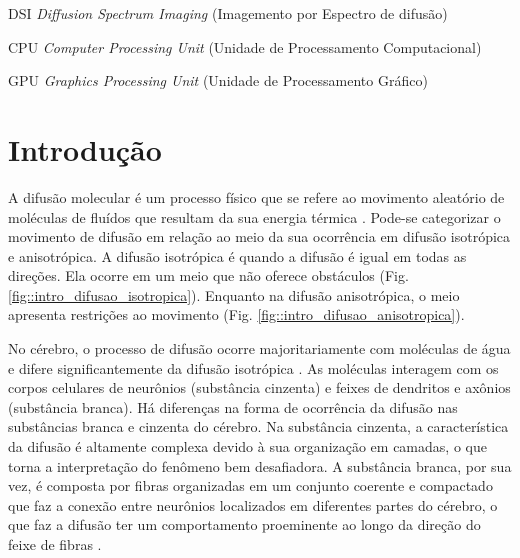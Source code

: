 \documentclass[
    12pt,                %
    oneside,            %
    a4paper,            %
    english,            %
    french,                %
    spanish,            %
    brazil                %
    ]{abntex2}
\begin{document}
\begin{siglas}


\item[DSI] \textit{Diffusion Spectrum Imaging} (Imagemento por Espectro de difusão)

\item [CPU] \textit{Computer Processing Unit} (Unidade de Processamento Computacional)

\item [GPU] \textit{Graphics Processing Unit} (Unidade de Processamento Gráfico)
\end{siglas}





\tableofcontents*
\cleardoublepage



\textual



\chapter{Introdução}
\label{sec:introducao}

A difusão molecular é um processo físico que se refere ao movimento aleatório de moléculas de fluídos que resultam da sua energia térmica \cite{lebihan2006}. 
Pode-se categorizar o movimento de difusão em relação ao meio da sua ocorrência em difusão isotrópica e anisotrópica. A difusão isotrópica é quando a difusão é igual em todas as direções. Ela ocorre em um meio que não oferece obstáculos (Fig. \ref{fig::intro_difusao_isotropica}). Enquanto na difusão anisotrópica, o meio apresenta restrições ao movimento (Fig. \ref{fig::intro_difusao_anisotropica}).

No cérebro, o processo de difusão ocorre majoritariamente com moléculas de água e difere significantemente da difusão isotrópica \cite{lebihan2006}. As moléculas interagem com os corpos celulares de neurônios (substância cinzenta) e feixes de dendritos e axônios (substância branca).
Há diferenças na forma de ocorrência da difusão nas substâncias branca e cinzenta do cérebro. Na substância cinzenta, a característica da difusão é altamente complexa devido à sua organização em camadas, o que torna a interpretação do fenômeno bem desafiadora. A substância branca, por sua vez, é composta por fibras organizadas em um conjunto coerente e compactado que faz a conexão entre neurônios localizados em diferentes partes do cérebro, o que faz a difusão ter um comportamento proeminente ao longo da direção do feixe de fibras \cite{DTI_Handbook}.
\end{document}
